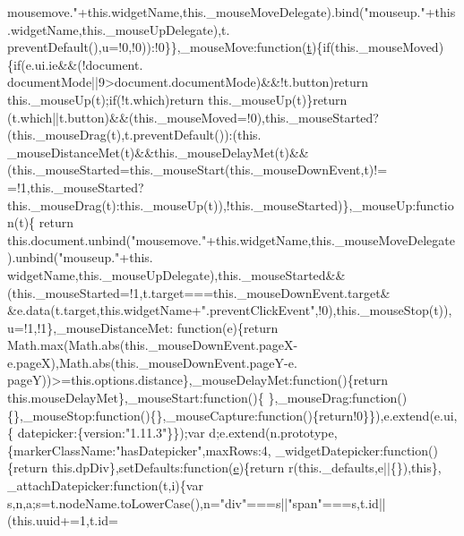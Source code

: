 \begin{DoxyCode}
{      mousemove."}+this.widgetName,this.\_mouseMoveDelegate).bind(\textcolor{stringliteral}{"mouseup."}+this.widgetName,this.\_mouseUpDelegate),t.
      preventDefault(),u=!0,!0)):!0\}\},\_mouseMove:\textcolor{keyword}{function}(\hyperlink{jquery-2_80_83_8min_8js_aaccc9105df5383111407fd5b41255e23}{t})\{\textcolor{keywordflow}{if}(this.\_mouseMoved)\{\textcolor{keywordflow}{if}(e.ui.ie&&(!document.
      documentMode||9>document.documentMode)&&!t.button)\textcolor{keywordflow}{return} this.\_mouseUp(t);\textcolor{keywordflow}{if}(!t.which)\textcolor{keywordflow}{return} this.\_mouseUp(t)\}\textcolor{keywordflow}{return}
      (t.which||t.button)&&(this.\_mouseMoved=!0),this.\_mouseStarted?(this.\_mouseDrag(t),t.preventDefault()):(this.
      \_mouseDistanceMet(t)&&this.\_mouseDelayMet(t)&&(this.\_mouseStarted=this.\_mouseStart(this.\_mouseDownEvent,t)!=
      =!1,this.\_mouseStarted?this.\_mouseDrag(t):this.\_mouseUp(t)),!this.\_mouseStarted)\},\_mouseUp:function(t)\{\textcolor{keywordflow}{
      return} this.document.unbind(\textcolor{stringliteral}{"mousemove."}+this.widgetName,this.\_mouseMoveDelegate).unbind(\textcolor{stringliteral}{"mouseup."}+this.
      widgetName,this.\_mouseUpDelegate),this.\_mouseStarted&&(this.\_mouseStarted=!1,t.target===this.\_mouseDownEvent.target&
      &e.data(t.target,\textcolor{keyword}{this}.widgetName+\textcolor{stringliteral}{".preventClickEvent"},!0),this.\_mouseStop(t)),u=!1,!1\},\_mouseDistanceMet:\textcolor{keyword}{
      function}(e)\{\textcolor{keywordflow}{return} Math.max(Math.abs(\textcolor{keyword}{this}.\_mouseDownEvent.pageX-e.pageX),Math.abs(this.\_mouseDownEvent.pageY-e.
      pageY))>=this.options.distance\},\_mouseDelayMet:\textcolor{keyword}{function}()\{\textcolor{keywordflow}{return} this.mouseDelayMet\},\_mouseStart:\textcolor{keyword}{function}()\{
      \},\_mouseDrag:\textcolor{keyword}{function}()\{\},\_mouseStop:\textcolor{keyword}{function}()\{\},\_mouseCapture:\textcolor{keyword}{function}()\{\textcolor{keywordflow}{return}!0\}\}),e.extend(e.ui,\{
      datepicker:\{version:\textcolor{stringliteral}{"1.11.3"}\}\});var d;e.extend(n.prototype,\{markerClassName:\textcolor{stringliteral}{"hasDatepicker"},maxRows:4,
      \_widgetDatepicker:\textcolor{keyword}{function}()\{\textcolor{keywordflow}{return} \textcolor{keyword}{this}.dpDiv\},setDefaults:\textcolor{keyword}{function}(\hyperlink{jquery-ui_8min_8js_a2c038346d47955cbe2cb91e338edd7e1}{e})\{\textcolor{keywordflow}{return} r(this.\_defaults,e||\{\}),\textcolor{keyword}{this}\},
      \_attachDatepicker:\textcolor{keyword}{function}(t,i)\{var s,n,a;s=t.nodeName.toLowerCase(),n=\textcolor{stringliteral}{"div"}===s||\textcolor{stringliteral}{"span"}===s,t.id||(this.uuid+=1,t.id=\textcolor{stringliteral}{
}
\end{DoxyCode}
